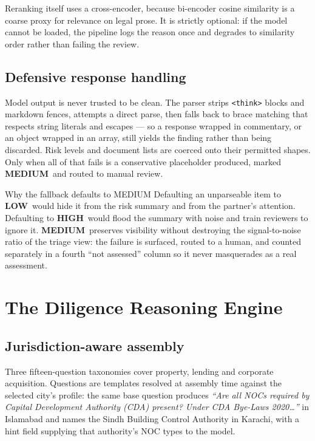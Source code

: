 \documentclass[11pt,a4paper]{article}
\newcommand{\code}[1]{\texttt{\small #1}}
\newcommand{\HI}{\textcolor{riskred}{\textbf{HIGH}}}
\newcommand{\ME}{\textcolor{amber}{\textbf{MEDIUM}}}
\newcommand{\LO}{\textcolor{forest}{\textbf{LOW}}}
\begin{document}
Reranking itself uses a cross-encoder, because bi-encoder cosine similarity is a coarse
proxy for relevance on legal prose. It is strictly optional: if the model cannot be loaded,
the pipeline logs the reason once and degrades to similarity order rather than failing the
review.

\subsection{Defensive response handling}

Model output is never trusted to be clean. The parser strips \code{<think>} blocks and
markdown fences, attempts a direct parse, then falls back to brace matching that respects
string literals and escapes --- so a response wrapped in commentary, or an object wrapped in
an array, still yields the finding rather than being discarded. Risk levels and document
lists are coerced onto their permitted shapes. Only when all of that fails is a conservative
placeholder produced, marked \ME\ and routed to manual review.

\begin{keybox}{Why the fallback defaults to MEDIUM}
\small
Defaulting an unparseable item to \LO\ would hide it from the risk summary and from the
partner's attention. Defaulting to \HI\ would flood the summary with noise and train
reviewers to ignore it. \ME\ preserves visibility without destroying the signal-to-noise
ratio of the triage view: the failure is surfaced, routed to a human, and counted
separately in a fourth ``not assessed'' column so it never masquerades as a real
assessment.
\end{keybox}

\section{The Diligence Reasoning Engine}

\subsection{Jurisdiction-aware assembly}

Three fifteen-question taxonomies cover property, lending and corporate acquisition.
Questions are templates resolved at assembly time against the selected city's profile: the
same base question produces \emph{``Are all NOCs required by Capital Development Authority
(CDA) present? Under CDA Bye-Laws 2020\ldots''} in Islamabad and names the Sindh Building
Control Authority in Karachi, with a hint field supplying that authority's NOC types to the
model.
\end{document}
